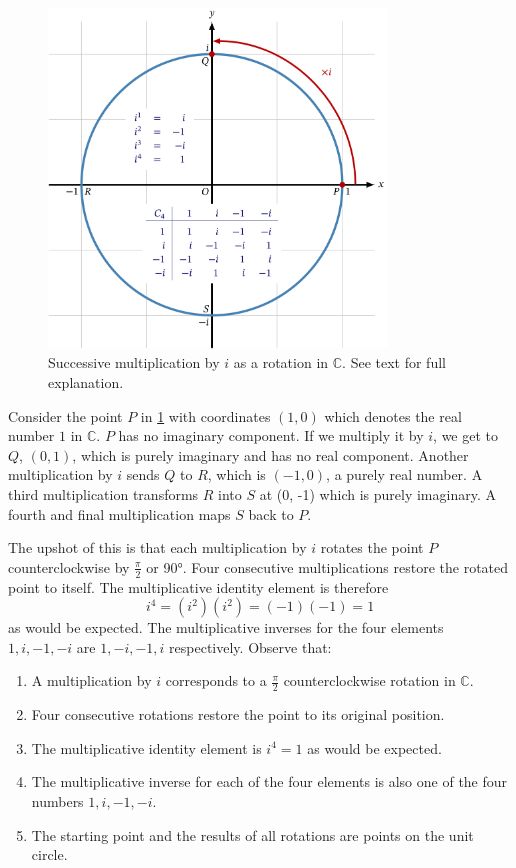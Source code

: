 \documentclass[
  a4paper,
]{article}
\providecommand{\tightlist}{%
  \setlength{\itemsep}{0pt}\setlength{\parskip}{0pt}}
\begin{document}
\begin{figure}
\hypertarget{fig:C4}{%
\centering
\includegraphics[width=0.8\textwidth,height=\textheight]{images/C4.png}
\caption{Successive multiplication by \(i\) as a rotation in
\(\mathbb{C}\). See text for full explanation.}\label{fig:C4}
}
\end{figure}

Consider the point \(P\) in \cref{fig:C4} with coordinates \((1, 0)\)
which denotes the real number \(1\) in \(\mathbb{C}\). \(P\) has no
imaginary component. If we multiply it by \(i\), we get to \(Q\),
\((0, 1)\), which is purely imaginary and has no real component. Another
multiplication by \(i\) sends \(Q\) to \(R\), which is \((-1, 0)\), a
purely real number. A third multiplication transforms \(R\) into \(S\)
at (0, -1) which is purely imaginary. A fourth and final multiplication
maps \(S\) back to \(P\).

The upshot of this is that each multiplication by \(i\) rotates the
point \(P\) counterclockwise by \(\frac{\pi}{2}\) or 90°. Four
consecutive multiplications restore the rotated point to itself. The
multiplicative identity element is therefore \[
i^4 = (i^2)(i^2) = (-1)(-1) = 1
\] as would be expected. The multiplicative inverses for the four
elements \(1, i, -1, -i\) are \(1, -i, -1, i\) respectively. Observe
that:

\begin{enumerate}
\tightlist
\item
  A multiplication by \(i\) corresponds to a \(\frac{\pi}{2}\)
  counterclockwise rotation in \(\mathbb{C}\).
\item
  Four consecutive rotations restore the point to its original position.
\item
  The multiplicative identity element is \(i^4 = 1\) as would be
  expected.
\item
  The multiplicative inverse for each of the four elements is also one
  of the four numbers \(1, i, -1, -i\).
\item
  The starting point and the results of all rotations are points on the
  unit circle.
\end{enumerate}
\end{document}
